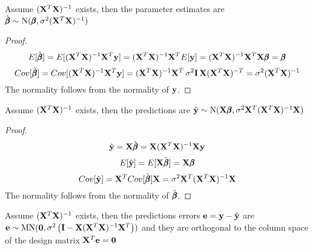 \begin{proposition}
Assume $(\mathbf{X}^T \mathbf{X})^{-1}$ exists, then the parameter estimates are $\hat{\pmb{\beta}} \sim \text{N}(\pmb{\beta},\sigma^2 (\mathbf{X}^T \mathbf{X})^{-1})$
\end{proposition}
\begin{proof}
\begin{equation*}
E[\hat{\pmb{\beta}}] = E[(\mathbf{X}^T \mathbf{X})^{-1} \mathbf{X}^T \mathbf{y}] = (\mathbf{X}^T \mathbf{X})^{-1} \mathbf{X}^T E[\mathbf{y}] = (\mathbf{X}^T \mathbf{X})^{-1} \mathbf{X}^T \mathbf{X} \pmb{\beta} = \pmb{\beta}
\end{equation*}
\begin{equation*}
Cov[\hat{\pmb{\beta}}] = Cov[(\mathbf{X}^T \mathbf{X})^{-1} \mathbf{X}^T \mathbf{y}] = (\mathbf{X}^T \mathbf{X})^{-1} \mathbf{X}^T \, \sigma^2 \mathbf{I} \, \mathbf{X} (\mathbf{X}^T \mathbf{X})^{-T} = \sigma^2 (\mathbf{X}^T \mathbf{X})^{-1}
\end{equation*}
The normality follows from the normality of $\mathbf{y}$.
\end{proof}

\begin{proposition}
Assume $(\mathbf{X}^T \mathbf{X})^{-1}$ exists, then the predictions are $\hat{\mathbf{y}} \sim \text{N}(\mathbf{X} \pmb{\beta},\sigma^2 \mathbf{X}^T (\mathbf{X}^T \mathbf{X})^{-1} \mathbf{X})$
\end{proposition}
\begin{proof}
\begin{equation*}
\hat{\mathbf{y}} = \mathbf{X} \hat{\pmb{\beta}} = \mathbf{X} (\mathbf{X}^T \mathbf{X})^{-1} \mathbf{X} \mathbf{y}
\end{equation*}
\begin{equation*}
E[\hat{\mathbf{y}}] = E[\mathbf{X} \hat{\pmb{\beta}}] = \mathbf{X} \pmb{\beta}
\end{equation*}
\begin{equation*}
Cov[\hat{\mathbf{y}}] = \mathbf{X}^T Cov[\hat{\pmb{\beta}}] \mathbf{X} = \sigma^2 \mathbf{X}^T (\mathbf{X}^T \mathbf{X})^{-1} \mathbf{X} 
\end{equation*}
The normality follows from the normality of $\hat{\pmb{\beta}}$.
\end{proof}

\begin{proposition}\label{prop:ResidOrtho}
Assume $(\mathbf{X}^T \mathbf{X})^{-1}$ exists, then the predictions errors $\mathbf{e} = \mathbf{y} - \hat{\mathbf{y}}$ are $\mathbf{e} \sim \text{MN}(\mathbf{0},\sigma^2 \left(\mathbf{I} - \mathbf{X} (\mathbf{X}^T \mathbf{X})^{-1} \mathbf{X}^T\right))$ and they are orthogonal to the column space of the design matrix $\mathbf{X}^T \mathbf{e} = \mathbf{0}$
\end{proposition}


